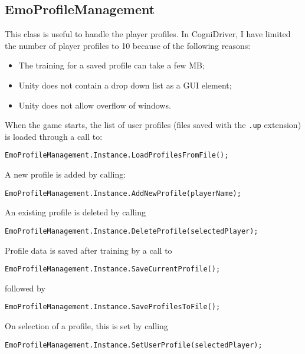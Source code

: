 \subsection{EmoProfileManagement}
This class is useful to handle the player profiles. In CogniDriver, I have limited the number of player profiles to 10 because of the following reasons:
\begin{itemize}
	\item The training for a saved profile can take a few MB;
	\item Unity does not contain a drop down list as a GUI element;
	\item Unity does not allow overflow of windows.
\end{itemize}

When the game starts, the list of user profiles (files saved with the \texttt{.up} extension) is loaded through a call to:

\begin{Verbatim}[frame=single, framesep=3mm]
EmoProfileManagement.Instance.LoadProfilesFromFile();
\end{Verbatim}

A new profile is added by calling:

\begin{Verbatim}[frame=single, framesep=3mm]
EmoProfileManagement.Instance.AddNewProfile(playerName);
\end{Verbatim}

An existing profile is deleted by calling

\begin{Verbatim}[frame=single, framesep=3mm]
EmoProfileManagement.Instance.DeleteProfile(selectedPlayer);
\end{Verbatim}

Profile data is saved after training by a call to 

\begin{Verbatim}[frame=single, framesep=3mm]
EmoProfileManagement.Instance.SaveCurrentProfile();
\end{Verbatim}

followed by

\begin{Verbatim}[frame=single, framesep=3mm]
EmoProfileManagement.Instance.SaveProfilesToFile();
\end{Verbatim}

On selection of a profile, this is set by calling

\begin{Verbatim}[frame=single, framesep=3mm]
EmoProfileManagement.Instance.SetUserProfile(selectedPlayer);
\end{Verbatim}

